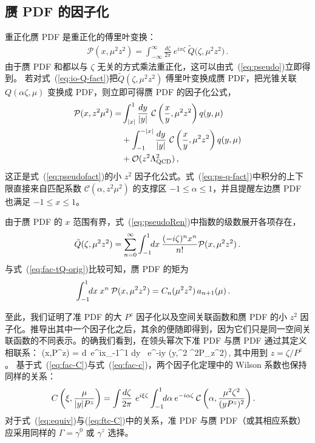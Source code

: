 \subsection{赝 PDF 的因子化}

重正化赝 PDF 是重正化\spcorr 的傅里叶变换：
\begin{align} \label{eq:pseudoRen}
\mathcal{P} \left( x, \mu^2 z^2\right)
   = \int_{-\infty}^\infty \! \frac{d \zeta}{2\pi}\:
    e^{ix \zeta}\: \tilde{Q}\bigl( \zeta, \mu^2 z^2 \bigr)
   \,.
\end{align}
由于赝 PDF 和\spcorr 都以与 $\zeta$ 无关的方式乘法重正化，这可以由式~(\ref{eq:pseudo})立即得到。
若对式~(\ref{eq:io-Q-fact})把\spcorr $\tilde Q(\zeta,\mu^2z^2)$ 傅里叶变换成赝 PDF，把光锥关联 $Q(\alpha\zeta,\mu)$ 变换成 PDF，则立即可得赝 PDF 的因子化公式，
\begin{align}\label{eq:ps-q-fact}
\mathcal{P}(x,z^2\mu^2) =
 &\int_{|x|}^1 {dy\over |y|}\
  \mathcal{C}\left({x\over y},\mu^2 z^2\right) q(y,\mu)\\
&+\int^{-|x|}_{-1} {dy\over |y|}\
  \mathcal{C}\left( \frac{x}{y}, \mu^2z^2\right) q(y,\mu)
  \nonumber \\
 &+ {\cal O}(z^2\Lambda_{\rm QCD}^2)\,,\nonumber
\end{align}
这正是式~(\ref{eq:pseudofact})的小 $z^2$ 因子化公式。式~(\ref{eq:ps-q-fact})中积分的上下限直接来自匹配系数 $\mathcal{C}(\alpha,z^2\mu^2)$ 的支撑区 $-1\le \alpha \le 1$，并且提醒左边赝 PDF 也满足 $-1\le x\le 1$。

由于赝 PDF 的 $x$ 范围有界，式~(\ref{eq:pseudoRen})中指数的级数展开各项存在，
\begin{align}
  \tilde Q(\zeta,\mu^2 z^2)
   = \sum_{n=0}^\infty \int_{-1}^{1}\!\! dx\: \frac{(-i\zeta)^n x^n}{n!}
     {\cal P}(x,\mu^2 z^2) \,.
\end{align}
与式~(\ref{eq:fac-tQ-orig})比较可知，赝 PDF 的矩为
\begin{align}  \label{eq:Pmoment}
  \int_{-1}^{1}\!\! dx\: x^n \:  {\cal P}(x,\mu^2 z^2)
  &= C_n(\mu^2 z^2)\, a_{n+1}(\mu) \,.
\end{align}

至此，我们证明了准 PDF 的大 $P^z$ 因子化以及空间关联函数和赝 PDF 的小 $z^2$ 因子化。推导出其中一个因子化之后，其余的便随即得到，因为它们只是同一空间关联函数的不同表示。的确我们看到，在领头幂次下准 PDF 与赝 PDF 通过其定义相联系：
\beq \label{eq:equiv}
\tilde{q}\Bigl(x,{\mu\over P^z}\Bigr)
  = \int\! {d\zeta{}\pi}\ e^{ix\zeta}\int_{-1}^1\!\! dy \ e^{-iy\zeta}
  \: \mathcal{P}\biggl(y,{\mu^2 \zeta^2\over P_z^2}\biggr)\,,
\eeq
其中用到 $z=\zeta/P^z$。
基于式~(\ref{eq:fac-C})与式~(\ref{eq:fac-c})，两个因子化定理中的 Wilson 系数也保持同样的关系：
\begin{align} \label{eq:ftc-C}
 C\left(\xi,{\mu\over |y|P^z}\right)
  &= \int\! {d\zeta\over 2\pi}\ e^{i\xi\zeta}\int_{-1}^1\!\! d\alpha\: e^{-i\alpha\zeta}\: \mathcal{C}\left(\alpha,{\mu^2 \zeta^2\over (yP^z)^2}\right) .
\end{align}
对于式~(\ref{eq:equiv})与(\ref{eq:ftc-C})中的关系，准 PDF 与赝 PDF（或其相应系数）应采用同样的 $\Gamma=\gamma^0$ 或 $\gamma^z$ 选择。

